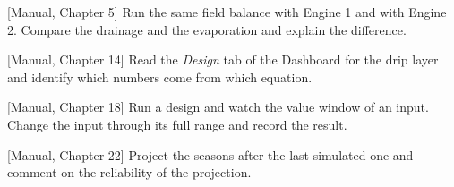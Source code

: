 \begin{exlist}
\item {\color{khblue}[Manual, Chapter 5]} Run the same field balance with Engine 1 and with Engine 2. Compare the drainage and the evaporation and explain the difference.\par{}
\item {\color{khblue}[Manual, Chapter 14]} Read the \emph{Design} tab of the Dashboard for the drip layer and identify which numbers come from which equation.\par{}
\item {\color{khblue}[Manual, Chapter 18]} Run a design and watch the value window of an input. Change the input through its full range and record the result.\par{}
\item {\color{khblue}[Manual, Chapter 22]} Project the seasons after the last simulated one and comment on the reliability of the projection.\par{}
\end{exlist}
